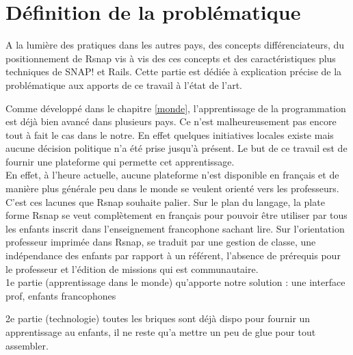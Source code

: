 \section{Définition de la problématique}
A la lumière des pratiques dans les autres pays, des concepts différenciateurs, du positionnement de Rsnap vis à vis des ces concepts et des caractéristiques plus techniques de SNAP! et Rails. Cette partie est dédiée à explication précise de la problématique aux apports de ce travail à l'état de l'art.

Comme développé dans le chapitre \ref{monde}, l'apprentissage de la programmation est déjà bien avancé dans plusieurs pays. Ce n'est malheureusement pas encore tout à fait le cas dans le notre. En effet quelques initiatives locales existe mais aucune décision politique n'a été prise jusqu'à présent. Le but de ce travail est de fournir une plateforme qui permette cet apprentissage.\\

En effet, à l'heure actuelle, aucune plateforme n'est disponible en français et de manière plus générale peu dans le monde se veulent orienté vers les professeurs. C'est ces lacunes que Rsnap souhaite palier. Sur le plan du langage, la plate forme Rsnap se veut complètement en français pour pouvoir être utiliser par tous les enfants inscrit dans l'enseignement francophone sachant lire. Sur l'orientation professeur imprimée dans Rsnap, se traduit par une gestion de classe, une indépendance des enfants par rapport à un référent, l'absence de prérequis pour le professeur et l'édition de missions qui est communautaire.\\



1e partie (apprentissage dans le monde) qu'apporte notre solution : une interface prof, enfants francophones

2e partie (technologie) toutes les briques sont déjà dispo pour fournir un apprentissage au enfants, il ne reste qu'a mettre un peu de glue pour tout assembler.
